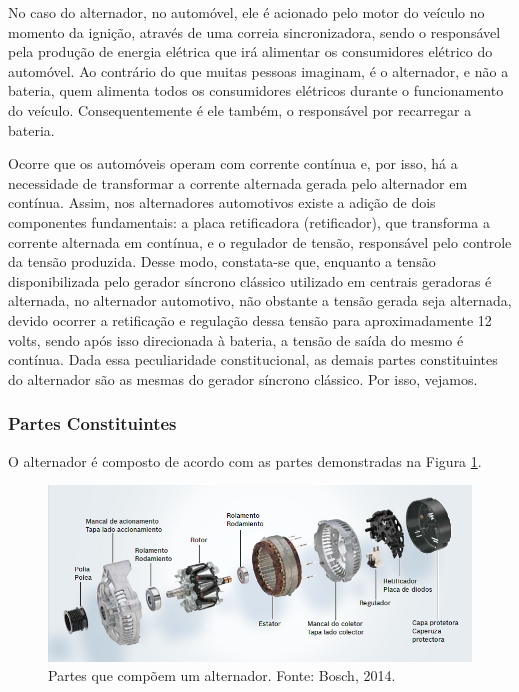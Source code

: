 No caso do alternador, no automóvel, ele é acionado pelo motor do veículo no momento da ignição, através de uma correia sincronizadora, sendo o responsável pela produção de energia elétrica que irá alimentar os consumidores elétrico do automóvel. Ao contrário do que muitas pessoas imaginam, é o alternador, e não a bateria, quem alimenta todos os consumidores elétricos durante o funcionamento do veículo. Consequentemente é ele também, o responsável por recarregar a bateria.

 Ocorre que os automóveis operam com corrente contínua e, por isso, há a necessidade de transformar a corrente alternada gerada pelo alternador em contínua. Assim, nos alternadores automotivos existe a adição de dois componentes fundamentais: a placa retificadora (retificador), que transforma a corrente alternada em contínua, e o regulador de tensão, responsável pelo controle da tensão produzida.
Desse modo, constata-se que, enquanto a tensão disponibilizada pelo gerador síncrono clássico utilizado em centrais geradoras é alternada, no alternador automotivo, não obstante a tensão gerada seja alternada, devido ocorrer a retificação e regulação dessa tensão para aproximadamente 12 volts, sendo após isso direcionada à bateria, a tensão de saída do mesmo é contínua. Dada essa peculiaridade constitucional, as demais partes constituintes do alternador são as mesmas do gerador síncrono clássico. Por isso, vejamos. 

\subsubsection{Partes Constituintes}
\label{construtivas-gerador-sincrono}

O alternador é composto de acordo com as partes demonstradas na Figura \ref{partes-alternador}.

\begin{figure}[h]
	\centering
	\includegraphics[scale= 0.6]		{figuras/partes_alternador.png}
	\caption{Partes que compõem um alternador. Fonte: Bosch, 2014. }
	\label{partes-alternador}
\end{figure}


